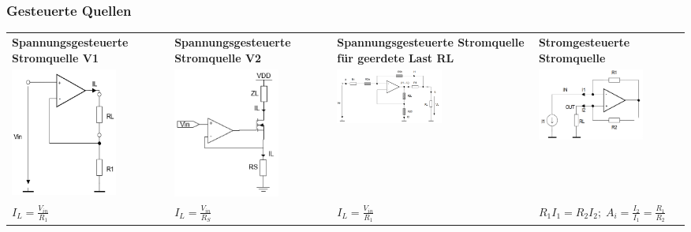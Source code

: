 \documentclass[margin=normal]{tex/hsrzf}
\begin{document}
\subsubsection{Gesteuerte Quellen}
\begingroup
\small
\begin{tabularx}{0.8\textwidth}{p{100pt}p{100pt}p{100pt}p{120pt}}
  \textbf{Spannungsgesteuerte \newline Stromquelle V1}                                         &
  \textbf{Spannungsgesteuerte \newline  Stromquelle V2}                                        &
  \textbf{Spannungsgesteuerte \newline Stromquelle \newline
  für geerdete Last RL}                                                                        &
  \textbf{Stromgesteuerte \newline Stromquelle}                                                  \\
  \includegraphics[width = 3.5cm]{img/OpAmp/Spannungsgesteuerte_Stromquelle_V1.png}            &
  \includegraphics[width = 3.5cm]{img/OpAmp/Spannungsgesteuerte_Stromquelle_V2.png}            &
  \includegraphics[width = 3.5cm]{img/OpAmp/Spannungsgesteuerte_Stromquelle_geerdete_Last.png} &
  \includegraphics[width = 3.5cm]{img/OpAmp/Stromgesteuerte_Stromquelle.png}                     \\
  $ I_L = \frac{V_{in}}{R_1} $                                                                 &
  $ I_L = \frac{V_{in}}{R_S} $                                                                 &
  $ I_L = \frac{V_{in}}{R_1} $                                                                 &
  $ R_1I_1=R_2I_2; \; A_i = \frac{I_2}{I_1} = \frac{R_1}{R_2}  $
\end{tabularx}
\endgroup
\end{document}
